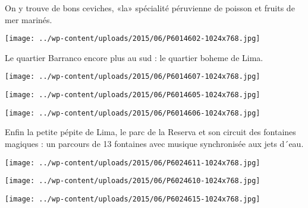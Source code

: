  

On y trouve de bons ceviches, «la» spécialité péruvienne de poisson et fruits de mer marinés. 

 

\begin{center} \texttt{[image: ../wp-content/uploads/2015/06/P6014602-1024x768.jpg]} \end{center}

 
\pagebreak

Le quartier Barranco encore plus au sud : le quartier boheme de Lima. 

 

\begin{center} \texttt{[image: ../wp-content/uploads/2015/06/P6014607-1024x768.jpg]} \end{center}

 

 

\begin{center} \texttt{[image: ../wp-content/uploads/2015/06/P6014605-1024x768.jpg]} \end{center}

 

 

\begin{center} \texttt{[image: ../wp-content/uploads/2015/06/P6014606-1024x768.jpg]} \end{center}

 

Enfin la petite pépite de Lima, le parc de la Reserva et son circuit des fontaines magiques : un parcours de 13 fontaines avec musique synchronisée aux jets d´eau. 

 

\begin{center} \texttt{[image: ../wp-content/uploads/2015/06/P6024611-1024x768.jpg]} \end{center}

 

 

\begin{center} \texttt{[image: ../wp-content/uploads/2015/06/P6024610-1024x768.jpg]} \end{center}

 

 

\begin{center} \texttt{[image: ../wp-content/uploads/2015/06/P6024615-1024x768.jpg]} \end{center}

